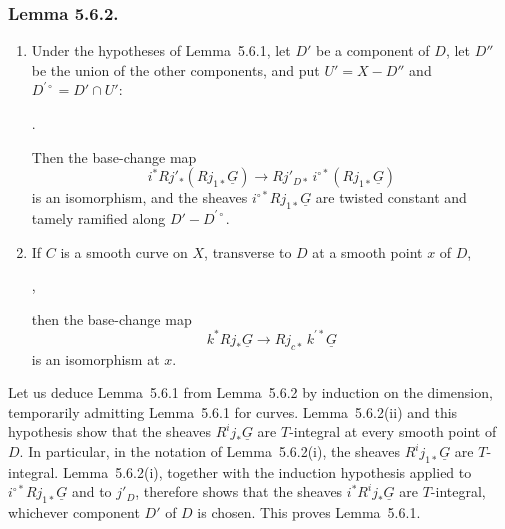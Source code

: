\subsubsection*{Lemma 5.6.2.}
\begin{enumerate}[label=(\roman*)]
\item Under the hypotheses of Lemma~5.6.1, let $D'$ be a component of $D$,
  let $D''$ be the union of the other components, and put
  $U'=X-D''$ and $D^{\prime\circ}=D'\cap U'$:
  \begin{center}
  \qquad .
  \end{center}
  Then the base-change map
  \[
  i^*Rj'_*(Rj_{1*}\underline G)
  \longrightarrow
  Rj'_{D*}\,i^{\circ *}(Rj_{1*}\underline G)
  \]
  is an isomorphism, and the sheaves
  $i^{\circ *}Rj_{1*}\underline G$ are twisted constant and tamely ramified
  along $D'-D^{\prime\circ}$.

\item If $C$ is a smooth curve on $X$, transverse to $D$ at a smooth point
  $x$ of $D$,
  \begin{center}
  \qquad ,
  \end{center}
  then the base-change map
  \[
  k^*Rj_*\underline G\longrightarrow Rj_{c*}\,k^{\prime *}\underline G
  \]
  is an isomorphism at $x$.
\end{enumerate}

Let us deduce Lemma~5.6.1 from Lemma~5.6.2 by induction on the dimension,
temporarily admitting Lemma~5.6.1 for curves.  Lemma~5.6.2(ii) and this
hypothesis show that the sheaves $R^ij_*\underline G$ are $T$-integral at
every smooth point of $D$.  In particular, in the notation of
Lemma~5.6.2(i), the sheaves $R^ij_{1*}\underline G$ are $T$-integral.
Lemma~5.6.2(i), together with the induction hypothesis applied to
$i^{\circ *}Rj_{1*}\underline G$ and to $j'_D$, therefore shows that the
sheaves $i^*R^ij_*\underline G$ are $T$-integral, whichever component $D'$
of $D$ is chosen.  This proves Lemma~5.6.1.

